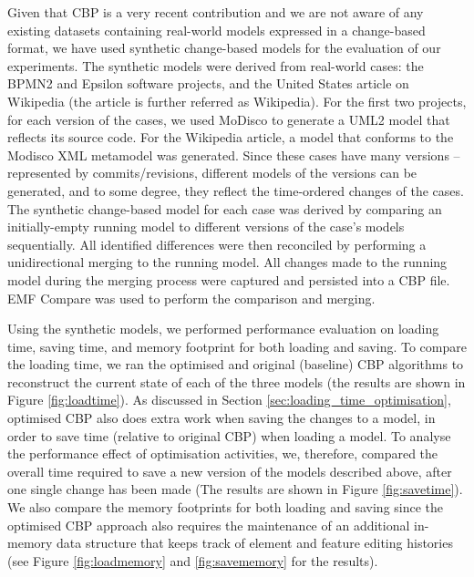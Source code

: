 \documentclass{llncs}
\begin{document}
{    Given that CBP is a very recent contribution and we are not aware of any existing datasets containing real-world models expressed in a change-based format, we have used synthetic change-based models for the evaluation of our experiments. The synthetic models were derived from real-world cases: the BPMN2 \cite{eclipse2017bpmn2,eclipse2018bpmn2git} and Epsilon \cite{eclipse2017epsilon,eclipse2018epsilongit} software projects, and the United States article \cite{wikipedia2018us} on Wikipedia (the article is further referred as Wikipedia). For the first two projects, for each version of the cases, we used MoDisco \cite{DBLP:journals/infsof/BruneliereCDM14} to generate a UML2 \cite{eclipse2017uml2} model that reflects its source code. For the Wikipedia article, a model that conforms to the Modisco XML metamodel \cite{eclipse2018modiscoxml} was generated. Since these cases have many versions -- represented by commits/revisions, different models of the versions can be generated, and to some degree, they reflect the time-ordered changes of the cases. The synthetic change-based model for each case was derived by comparing an initially-empty running model to different versions of the case's models sequentially. All identified differences were then reconciled by performing a unidirectional merging to the running model. All changes made to the running model during the merging process were captured and persisted into a CBP file. EMF Compare was used \cite{eclipse2017compare} to perform the comparison and merging.
    
    Using the synthetic models, we performed performance evaluation on loading time, saving time, and memory footprint for both loading and saving. To compare the loading time, we ran the optimised and original (baseline) CBP algorithms to reconstruct the current state of each of the three models (the results are shown in Figure \ref{fig:loadtime}). As discussed in Section \ref{sec:loading_time_optimisation}, optimised CBP also does extra work when saving the changes to a model, in order to save time (relative to original CBP) when loading a model. To analyse the performance effect of optimisation activities, we, therefore, compared the overall time required to save a new version of the models described above, after one single change has been made (The results are shown in Figure \ref{fig:savetime}). We also compare the memory footprints for both loading and saving since the optimised CBP approach also requires the maintenance of an additional in-memory data structure that keeps track of element and feature editing histories (see Figure \ref{fig:loadmemory} and \ref{fig:savememory} for the results). 
    
}
\end{document}
